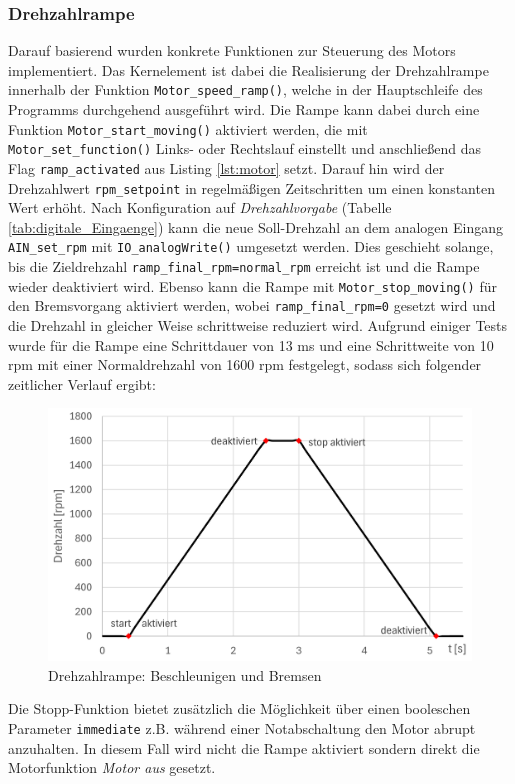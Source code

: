 \subsubsection{Drehzahlrampe}
Darauf basierend wurden konkrete Funktionen zur Steuerung des Motors implementiert. Das Kernelement ist dabei die Realisierung der Drehzahlrampe innerhalb der Funktion \verb|Motor_speed_ramp()|, welche in der Hauptschleife des Programms durchgehend ausgeführt wird. Die Rampe kann dabei durch eine Funktion \verb|Motor_start_moving()| aktiviert werden, die mit \verb|Motor_set_function()| Links- oder Rechtslauf einstellt und anschließend das Flag \verb|ramp_activated| aus Listing \ref{lst:motor} setzt. Darauf hin wird der Drehzahlwert \verb|rpm_setpoint| in regelmäßigen Zeitschritten um einen konstanten Wert erhöht. Nach Konfiguration auf \textit{Drehzahlvorgabe} (Tabelle \ref{tab:digitale_Eingaenge}) kann die neue Soll-Drehzahl an dem analogen Eingang \verb|AIN_set_rpm| mit \verb|IO_analogWrite()| umgesetzt werden. Dies geschieht solange, bis die Zieldrehzahl \verb|ramp_final_rpm=normal_rpm| erreicht ist und die Rampe wieder deaktiviert wird. Ebenso kann die Rampe mit \verb|Motor_stop_moving()| für den Bremsvorgang aktiviert werden, wobei \verb|ramp_final_rpm=0| gesetzt wird und die Drehzahl in gleicher Weise schrittweise reduziert wird. Aufgrund einiger Tests wurde für die Rampe eine Schrittdauer von 13 ms und eine Schrittweite von 10 rpm mit einer Normaldrehzahl von 1600 rpm festgelegt, sodass sich folgender zeitlicher Verlauf ergibt:
\begin{figure}[H]
	\centering
	\includegraphics[width=0.75\linewidth]{images/Software/SpeedRamp.png}
	\caption{Drehzahlrampe: Beschleunigen und Bremsen}
	\label{fig:speedRamp}
\end{figure}
\noindent
Die Stopp-Funktion bietet zusätzlich die Möglichkeit über einen booleschen Parameter \verb|immediate| z.B. während einer Notabschaltung den Motor abrupt anzuhalten. In diesem Fall wird nicht die Rampe aktiviert sondern direkt die Motorfunktion \textit{Motor aus} gesetzt. 

